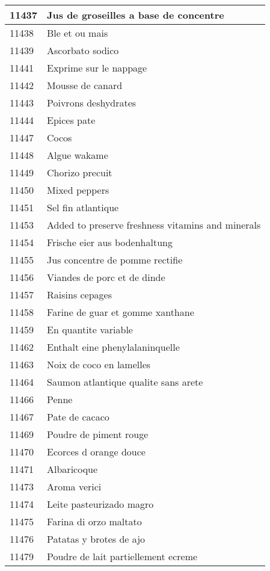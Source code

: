 \begin{longtable}{|l|l|}
11437 & Jus de groseilles a base de concentre \\ \hline 
11438 & Ble et ou mais \\ \hline 
11439 & Ascorbato sodico \\ \hline 
11441 & Exprime sur le nappage \\ \hline 
11442 & Mousse de canard \\ \hline 
11443 & Poivrons deshydrates \\ \hline 
11444 & Epices pate \\ \hline 
11447 & Cocos \\ \hline 
11448 & Algue wakame \\ \hline 
11449 & Chorizo precuit \\ \hline 
11450 & Mixed peppers \\ \hline 
11451 & Sel fin atlantique \\ \hline 
11453 & Added to preserve freshness vitamins and minerals \\ \hline 
11454 & Frische eier aus bodenhaltung \\ \hline 
11455 & Jus concentre de pomme rectifie \\ \hline 
11456 & Viandes de porc et de dinde \\ \hline 
11457 & Raisins cepages \\ \hline 
11458 & Farine de guar et gomme xanthane \\ \hline 
11459 & En quantite variable \\ \hline 
11462 & Enthalt eine phenylalaninquelle \\ \hline 
11463 & Noix de coco en lamelles \\ \hline 
11464 & Saumon atlantique qualite sans arete \\ \hline 
11466 & Penne \\ \hline 
11467 & Pate de cacaco \\ \hline 
11469 & Poudre de piment rouge \\ \hline 
11470 & Ecorces d orange douce \\ \hline 
11471 & Albaricoque \\ \hline 
11473 & Aroma verici \\ \hline 
11474 & Leite pasteurizado magro \\ \hline 
11475 & Farina di orzo maltato \\ \hline 
11476 & Patatas y brotes de ajo \\ \hline 
11479 & Poudre de lait partiellement ecreme \\ \hline 

\end{longtable}
